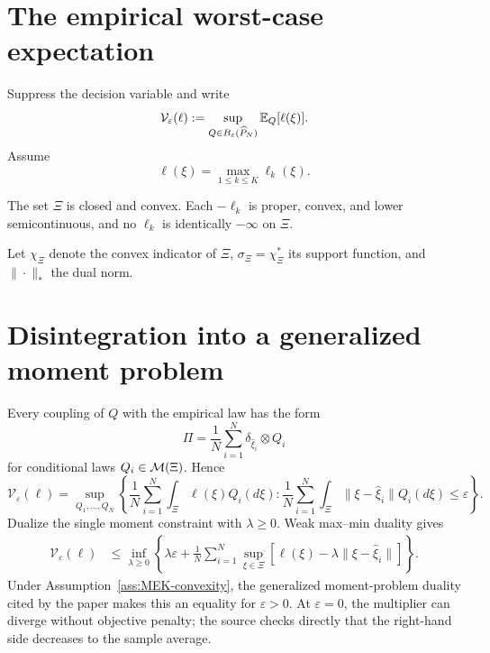 \section{The empirical worst-case expectation}
Suppress the decision variable and write
\begin{equation}\label{eq:MEK-wce}
 \mathcal V_\varepsilon(\ell)
 :=\sup_{Q\in B_\varepsilon(\widehat P_N)}\mathbb{E}_Q[\ell(\xi)].
\end{equation}
Assume
\begin{equation}\label{eq:MEK-piecewise}
 \ell(\xi)=\max_{1\le k\le K}\ell_k(\xi).
\end{equation}

\begin{assumption}\label{ass:MEK-convexity}
The set $\Xi$ is closed and convex.  Each $-\ell_k$ is proper, convex, and lower semicontinuous, and no $\ell_k$ is identically $-\infty$ on $\Xi$.
\end{assumption}

Let $\chi_\Xi$ denote the convex indicator of $\Xi$, $\sigma_\Xi=\chi_\Xi^*$ its support function, and $\|\cdot\|_*$ the dual norm.

\section{Disintegration into a generalized moment problem}
Every coupling of $Q$ with the empirical law has the form
\[
 \Pi=\frac1N\sum_{i=1}^N\delta_{\widehat\xi_i}\otimes Q_i
\]
for conditional laws $Q_i\in\mathcal{M}(\Xi)$.  Hence
\begin{equation}\label{eq:MEK-moment-primal}
 \mathcal V_\varepsilon(\ell)
 =\sup_{Q_1,\dots,Q_N}
 \left\{
 \frac1N\sum_{i=1}^N\int_\Xi\ell(\xi)Q_i(d\xi):
 \frac1N\sum_{i=1}^N\int_\Xi\|\xi-\widehat\xi_i\|Q_i(d\xi)
 \le\varepsilon
 \right\}.
\end{equation}
Dualize the single moment constraint with $\lambda\ge0$.  Weak max--min duality gives
\begin{align}
 \mathcal V_\varepsilon(\ell)
 &\le\inf_{\lambda\ge0}
 \left\{
 \lambda\varepsilon
 +\frac1N\sum_{i=1}^N
 \sup_{\xi\in\Xi}
 [\ell(\xi)-\lambda\|\xi-\widehat\xi_i\|]
 \right\}.
 \label{eq:MEK-scalar-dual}
\end{align}
Under Assumption~\ref{ass:MEK-convexity}, the generalized moment-problem duality cited by the paper makes this an equality for $\varepsilon>0$.  At $\varepsilon=0$, the multiplier can diverge without objective penalty; the source checks directly that the right-hand side decreases to the sample average.

